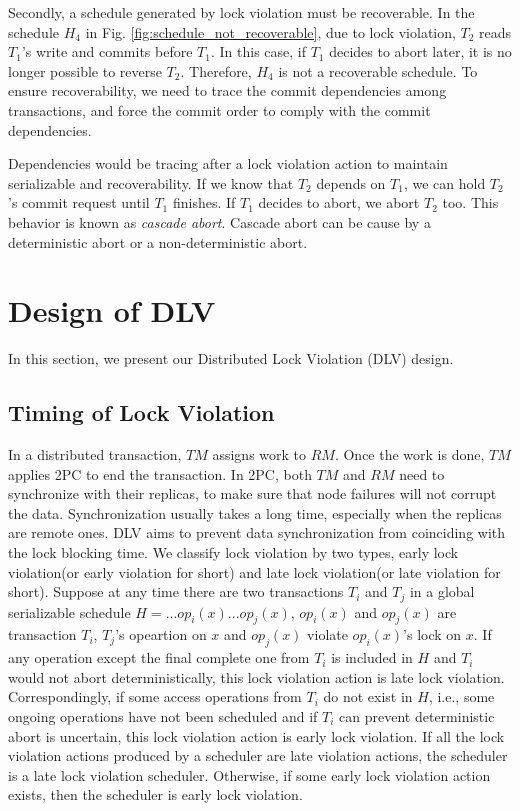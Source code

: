 \documentclass[conference]{IEEEtran}
\begin{document}
Secondly, a schedule generated by lock violation must be recoverable.
In the schedule ${H_4}$ in Fig.   \ref{fig:schedule_not_recoverable}, due to lock violation,
${T_2}$ reads  ${T_1}$'s write and commits before ${T_1}$.
In this case, if ${T_1}$ decides to abort later, it is no longer possible to reverse ${T_2}$.
Therefore, ${H_4}$ is not a recoverable schedule.
To ensure recoverability, we need to trace the commit dependencies among transactions, and force the commit order to comply with the commit dependencies.

Dependencies would be tracing after a lock violation action to maintain serializable and recoverability.
If we know that ${T_2}$ depends on ${T_1}$, we can hold ${T_2}$'s commit request until ${T_1}$ finishes.
If ${T_1}$ decides to abort, we abort ${T_2}$ too. 
This behavior is known as \emph{cascade abort}.
Cascade abort can be cause by a deterministic abort or a non-deterministic abort. 

\section{Design of DLV}
\label{sec:implement}

In this section, we present our Distributed Lock Violation (DLV) design.

\subsection {Timing of Lock Violation}


In a distributed transaction, $TM$ assigns work to $RM$. Once the work is done, $TM$ applies 2PC to end the transaction.
In 2PC, both $TM$ and $RM$ need to synchronize with their replicas, to make sure that node failures will not corrupt the data.
Synchronization usually takes a long time, especially when the replicas are remote ones.
DLV aims to prevent data synchronization from coinciding with the lock blocking time.
We classify lock violation by two types, early lock violation(or early violation for short) and late lock violation(or late violation for short).
Suppose at any time there are two transactions $T_i$ and $T_j$ in a global serializable schedule $H = ... op_i(x) ... op_j(x)$,
$op_i(x)$ and $op_j(x)$ are transaction $T_i$, $T_j$'s opeartion on $x$
and $op_j(x)$ violate $op_i(x)$'s lock on $x$.
If any operation except the final complete one from $T_i$ is included in $H$ and ${T_i}$ would not abort deterministically,   this lock violation action is late lock violation.
Correspondingly, if some access operations from  $T_i$ do not exist in $H$, i.e., some ongoing operations have not been scheduled and if $T_i$ can prevent deterministic abort is uncertain, this lock violation action is early lock violation.
If all the lock violation actions produced by a scheduler are late violation actions, the scheduler is a late lock violation scheduler.
Otherwise, if some early lock violation action exists, then the scheduler is early lock violation.
\end{document}
